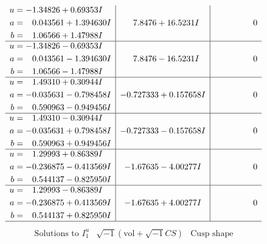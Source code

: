 \documentclass[1p]{elsarticle_modified}
\theoremstyle{definition}
\newcommand{\I}{\sqrt{-1}}
\begin{document}
$$\begin{array}{c|c|c}
\begin{aligned}
u &= -1.34826 + 0.69353 I \\
a &= \phantom{-}0.043561 + 1.394630 I \\
b &= \phantom{-}1.06566 + 1.47988 I\end{aligned}
 & \phantom{-}7.8476 + 16.5231 I & \phantom{-0.000000 } 0 \\ \hline\begin{aligned}
u &= -1.34826 - 0.69353 I \\
a &= \phantom{-}0.043561 - 1.394630 I \\
b &= \phantom{-}1.06566 - 1.47988 I\end{aligned}
 & \phantom{-}7.8476 - 16.5231 I & \phantom{-0.000000 } 0 \\ \hline\begin{aligned}
u &= \phantom{-}1.49310 + 0.30944 I \\
a &= -0.035631 - 0.798458 I \\
b &= \phantom{-}0.590963 - 0.949456 I\end{aligned}
 & -0.727333 + 0.157658 I & \phantom{-0.000000 } 0 \\ \hline\begin{aligned}
u &= \phantom{-}1.49310 - 0.30944 I \\
a &= -0.035631 + 0.798458 I \\
b &= \phantom{-}0.590963 + 0.949456 I\end{aligned}
 & -0.727333 - 0.157658 I & \phantom{-0.000000 } 0 \\ \hline\begin{aligned}
u &= \phantom{-}1.29993 + 0.86389 I \\
a &= -0.236875 - 0.413569 I \\
b &= \phantom{-}0.544137 - 0.825950 I\end{aligned}
 & -1.67635 - 4.00277 I & \phantom{-0.000000 } 0 \\ \hline\begin{aligned}
u &= \phantom{-}1.29993 - 0.86389 I \\
a &= -0.236875 + 0.413569 I \\
b &= \phantom{-}0.544137 + 0.825950 I\end{aligned}
 & -1.67635 + 4.00277 I & \phantom{-0.000000 } 0\\
 \hline 
 \end{array}$$\newpage$$\begin{array}{c|c|c}  
\text{Solutions to }I^u_{1}& \I (\text{vol} + \sqrt{-1}CS) & \text{Cusp shape}\\
 \hline 
\begin{aligned}

\end{aligned}
\end{array}$$
\end{document}

